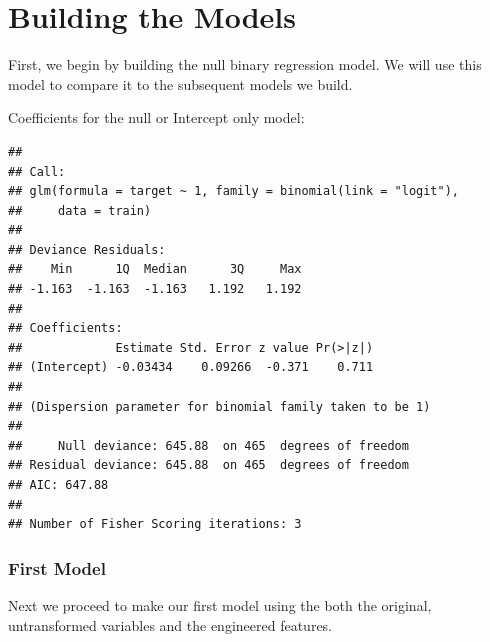 \documentclass[3p]{elsarticle} %
\begin{document}
\newpage

\hypertarget{building-the-models}{%
\section{Building the Models}\label{building-the-models}}

First, we begin by building the null binary regression model. We will
use this model to compare it to the subsequent models we build.

Coefficients for the null or Intercept only model:

\begin{verbatim}
## 
## Call:
## glm(formula = target ~ 1, family = binomial(link = "logit"), 
##     data = train)
## 
## Deviance Residuals: 
##    Min      1Q  Median      3Q     Max  
## -1.163  -1.163  -1.163   1.192   1.192  
## 
## Coefficients:
##             Estimate Std. Error z value Pr(>|z|)
## (Intercept) -0.03434    0.09266  -0.371    0.711
## 
## (Dispersion parameter for binomial family taken to be 1)
## 
##     Null deviance: 645.88  on 465  degrees of freedom
## Residual deviance: 645.88  on 465  degrees of freedom
## AIC: 647.88
## 
## Number of Fisher Scoring iterations: 3
\end{verbatim}

\hypertarget{first-model}{%
\subsubsection{First Model}\label{first-model}}

Next we proceed to make our first model using the both the original,
untransformed variables and the engineered features.
\end{document}
